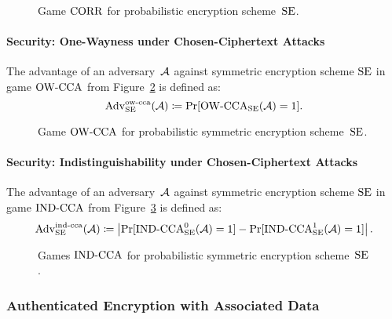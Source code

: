 \documentclass[a4paper,orivec]{llncs}
\begin{document}
\begin{figure}[!ht]
    \centering
    \nicoresetlinenr%
    \fbox{%
        \scalebox{\codescalefactor}{%
        }%
    }
    \caption{%
        Game $\mathrm{CORR}$ for probabilistic encryption scheme~$\mathrm{SE}$.
    }
    \label{fig:sym:enc:corr:prob}
\end{figure}

\paragraph{Security: One-Wayness under Chosen-Ciphertext Attacks}
The advantage of an adversary~$\mathcal{A}$ against symmetric encryption scheme $\mathrm{SE}$ in game ${\mathrm{OW}\text{-}\mathrm{CCA}}$ from Figure~\ref{fig:sym:enc:ow:prob} is defined as:
\[
\mathrm{Adv}_{\mathrm{SE}}^{\mathrm{ow}\text{-}\mathrm{cca}}(\mathcal{A})\coloneqq\Pr[{\mathrm{OW}\text{-}\mathrm{CCA}}_{\mathrm{SE}}(\mathcal{A})=1]\text{.}
\]

\begin{figure}[!ht]
    \centering
    \nicoresetlinenr%
    \fbox{%
        \scalebox{\codescalefactor}{%
        }%
    }
    \caption{%
        Game ${\mathrm{OW}\text{-}\mathrm{CCA}}$ for probabilistic symmetric encryption scheme~$\mathrm{SE}$.
    }
    \label{fig:sym:enc:ow:prob}
\end{figure}

\paragraph{Security: Indistinguishability under Chosen-Ciphertext Attacks}
The advantage of an adversary~$\mathcal{A}$ against symmetric encryption scheme $\mathrm{SE}$ in game ${\mathrm{IND}\text{-}\mathrm{CCA}}$ from Figure~\ref{fig:sym:enc:ind:prob} is defined as:
\[
\mathrm{Adv}_{\mathrm{SE}}^{\mathrm{ind}\text{-}\mathrm{cca}}(\mathcal{A})\coloneqq\left|\Pr[{\mathrm{IND}\text{-}\mathrm{CCA}}_{\mathrm{SE}}^0(\mathcal{A})=1]-\Pr[{\mathrm{IND}\text{-}\mathrm{CCA}}_{\mathrm{SE}}^1(\mathcal{A})=1]\right|\text{.}
\]

\begin{figure}[!ht]
    \centering
    \nicoresetlinenr%
    \fbox{%
        \scalebox{\codescalefactor}{%
        }%
    }
    \caption{%
        Games ${\mathrm{IND}\text{-}\mathrm{CCA}}$ for probabilistic symmetric encryption scheme~$\mathrm{SE}$.
    }
    \label{fig:sym:enc:ind:prob}
\end{figure}


\subsubsection{Authenticated Encryption with Associated Data}
\end{document}
